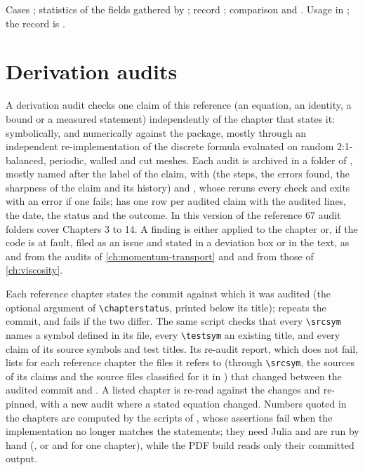 \begin{implnote}
Cases ; statistics
 of the fields gathered by
; record
; comparison
 and
. Usage in
; the record is .
\end{implnote}

\section{Derivation audits}\label{sec:verif:audits}
A derivation audit checks one claim of this reference (an equation, an
identity, a bound or a measured statement) independently of the chapter that
states it: symbolically, and numerically against the package, mostly through
an independent re-implementation of the discrete formula evaluated on random
2:1-balanced, periodic, walled and cut meshes. Each audit is archived in a
folder of , mostly named after the label of the claim,
with  (the steps, the errors found, the sharpness of the claim
and its history) and , whose  reruns every
check and exits with an error if one fails;  has
one row per audited claim with the audited lines, the date, the status and
the outcome. In this version of the reference $67$ audit folders cover
Chapters 3 to 14. A finding is either applied to the chapter or, if the code is at
fault, filed as an issue and stated in a deviation box or in the text, as
 and  from the audits of \cref{ch:momentum-transport} and
 and  from those of \cref{ch:viscosity}.

Each reference chapter states the commit against which it was audited (the
optional argument of \verb|\chapterstatus|, printed below its title);
 repeats the commit, and  fails if
the two differ. The same script checks that every \verb|\srcsym| names a
symbol defined in its file, every \verb|\testsym| an existing 
title, and every claim of  its source symbols and test
titles. Its re-audit report, which does not fail, lists for each reference
chapter the files it refers to (through \verb|\srcsym|, the sources of its
claims and the source files classified for it in ) that
changed between the audited commit and . A listed chapter is
re-read against the changes and re-pinned, with a new audit where a stated
equation changed. Numbers quoted in the chapters are computed by the scripts
of , whose assertions fail when the
implementation no longer matches the statements; they need Julia and are run
by hand (, or  and
 for one chapter), while the PDF build reads only
their committed output.

